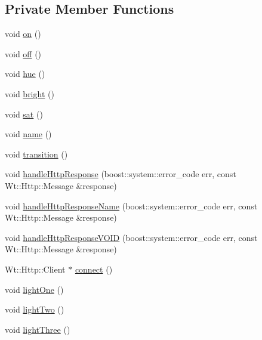 \subsection*{Private Member Functions}
\begin{DoxyCompactItemize}
\item 
void \hyperlink{class_scheduler_control_widget_ad703c8e5f15d4ebaaeeed55450d984f4}{on} ()
\item 
void \hyperlink{class_scheduler_control_widget_a4a88b0dd02bde7d3b77f6dc1b907dd46}{off} ()
\item 
void \hyperlink{class_scheduler_control_widget_ac94a6b7fffc3ad41f47d4f3055278a9f}{hue} ()
\item 
void \hyperlink{class_scheduler_control_widget_abfb0dd8c7d7ef3a7bef6f291cfcf5bdd}{bright} ()
\item 
void \hyperlink{class_scheduler_control_widget_a43834db378ceb523fa8c0ee7defea951}{sat} ()
\item 
void \hyperlink{class_scheduler_control_widget_aafbad4eb5ff9cf0d0d311dc805df49c1}{name} ()
\item 
void \hyperlink{class_scheduler_control_widget_a469057104fb5ce001a248a210fb90878}{transition} ()
\item 
void \hyperlink{class_scheduler_control_widget_a9b2cb5e76ca840104928a5016741cd4c}{handle\+Http\+Response} (boost\+::system\+::error\+\_\+code err, const Wt\+::\+Http\+::\+Message \&response)
\item 
void \hyperlink{class_scheduler_control_widget_a6adf770a92a199b5557ffabc0a6dc6a8}{handle\+Http\+Response\+Name} (boost\+::system\+::error\+\_\+code err, const Wt\+::\+Http\+::\+Message \&response)
\item 
void \hyperlink{class_scheduler_control_widget_a608cf1aa0348a5a9db24b199136beff6}{handle\+Http\+Response\+V\+O\+ID} (boost\+::system\+::error\+\_\+code err, const Wt\+::\+Http\+::\+Message \&response)
\item 
Wt\+::\+Http\+::\+Client $\ast$ \hyperlink{class_scheduler_control_widget_ace95dce867b19128d2ac1d9b7f6af2df}{connect} ()
\item 
void \hyperlink{class_scheduler_control_widget_ad7c66eaaf55c7ca61126e85681288f10}{light\+One} ()
\item 
void \hyperlink{class_scheduler_control_widget_a952c792697ead97f959faaef2f9344cd}{light\+Two} ()
\item 
void \hyperlink{class_scheduler_control_widget_a818b2e33f2e9cfc0fa466a6681d581fc}{light\+Three} ()
\item 

\end{DoxyCompactItemize}
